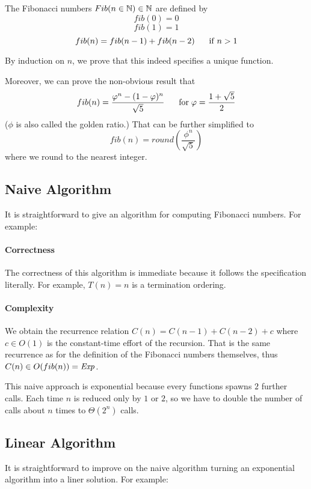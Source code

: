 The Fibonacci numbers $Fib(n\in\mathbb{N})\in\mathbb{N}$ are defined by
\[fib(0)=0\]
\[fib(1)=1\]
\[fib(n)=fib(n-1)+fib(n-2) \hspace*{.5cm}\;\mathrm{if}\; n>1\]

By induction on $n$, we prove that this indeed specifies a unique function.

Moreover, we can prove the non-obvious result that
 \[fib(n)=\frac{\varphi^n-(1-\varphi)^n}{\sqrt{5}} \hspace*{.5cm}\;\mathrm{for}\; \varphi=\frac{1+\sqrt{5}}{2}\]
($\phi$ is also called the golden ratio.)
That can be further simplified to
 \[fib(n)=round\left(\frac{\phi^n}{\sqrt{5}}\right)\]
where we round to the nearest integer.

\subsection{Naive Algorithm}\label{sec:ad:fib:naive}

It is straightforward to give an algorithm for computing Fibonacci numbers.
For example:
\begin{acode}
\end{acode}

\paragraph{Correctness}
The correctness of this algorithm is immediate because it follows the specification literally.
For example, $T(n)=n$ is a termination ordering.

\paragraph{Complexity}
We obtain the recurrence relation $C(n)=C(n-1)+C(n-2)+c$ where $c\in O(1)$ is the constant-time effort of the recursion.
That is the same recurrence as for the definition of the Fibonacci numbers themselves, thus $C(n)\in O(fib(n))=\mathit{Exp}$.

This naive approach is exponential because every functions spawns $2$ further calls.
Each time $n$ is reduced only by $1$ or $2$, so we have to double the number of calls about $n$ times to $\Theta(2^n)$ calls.

\subsection{Linear Algorithm}\label{sec:ad:fib:linear}

It is straightforward to improve on the naive algorithm turning an exponential algorithm into a liner solution.
For example:
\begin{acode}
\end{acode}

